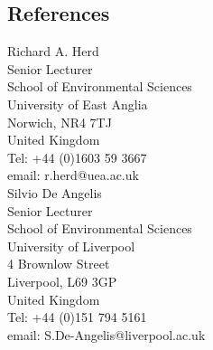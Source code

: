 \documentclass[margin,line]{res}
\begin{document}
\begin{resume}
\section{\sc References}
\begin{multicols}{2}

Richard A. Herd \\ 
Senior Lecturer \\ 
School of Environmental Sciences \\ 
University of East Anglia \\
Norwich, NR4 7TJ \\
United Kingdom \\
Tel: +44 (0)1603 59 3667 \\ 
email: r.herd@uea.ac.uk \\

Silvio De Angelis \\ 
Senior Lecturer \\ 
School of Environmental Sciences \\ 
University of Liverpool \\ 
4 Brownlow Street \\
Liverpool, L69 3GP \\
United Kingdom \\
Tel: +44 (0)151 794 5161 \\
email: S.De-Angelis@liverpool.ac.uk \\





\end{multicols}
\end{resume}
\end{document}
